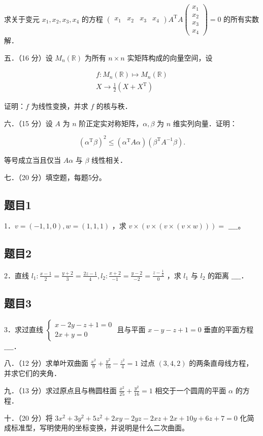\documentclass{article}
\begin{document}
求关于变元 \(x_{1}, x_{2}, x_{3}, x_{4}\) 的方程 \(\left(\begin{array}{llll}x_{1} & x_{2} & x_{3} & x_{4}\end{array}\right) A^{\mathrm{T}} A\left(\begin{array}{l}x_{1} \\ x_{2} \\ x_{3} \\ x_{4}\end{array}\right)=0\) 的所有实数解．

五．（16 分）设 \(M_{n}(\mathbb{R})\) 为所有 \(n \times n\) 实矩阵构成的向量空间，设

\[
\begin{gathered}
f: M_{n}(\mathbb{R}) \mapsto M_{n}(\mathbb{R}) \\
X \rightarrow \frac{1}{2}\left(X+X^{\mathrm{T}}\right)
\end{gathered}
\]

证明：\(f\) 为线性变换，并求 \(f\) 的核与秩．

六．（15 分）设 \(A\) 为 \(n\) 阶正定实对称矩阵，\(\alpha, \beta\) 为 \(n\) 维实列向量．证明：

\[
\left(\alpha^{\mathrm{T}} \beta\right)^{2} \leq\left(\alpha^{\mathrm{T}} A \alpha\right)\left(\beta^{\mathrm{T}} A^{-1} \beta\right) .
\]

等号成立当且仅当 \(A \alpha\) 与 \(\beta\) 线性相关．

七．（20 分）填空题，每题5分。\\

\subsection{题目1}
1．\(v=(-1,1,0), w=(1,1,1)\) ，求 \(v \times(v \times(v \times(v \times w)))=\) \(\_\_\_\_\)。\\

\subsection{题目2}
2．直线 \(l_{1}: \frac{x-1}{2}=\frac{y+2}{3}=\frac{2 z-1}{4}, l_{2}: \frac{x+2}{-1}=\frac{y-2}{-2}=\frac{z-\frac{1}{2}}{0}\) ，求 \(l_{1}\) 与 \(l_{2}\) 的距离 \(\_\_\_\_\)．\\

\subsection{题目3}
3．求过直线 \(\left\{\begin{array}{l}x-2 y-z+1=0 \\ 2 x+y=0\end{array}\right.\) 且与平面 \(x-y-z+1=0\) 垂直的平面方程\\
\(\_\_\_\_\)．

八．（12 分）求单叶双曲面 \(\frac{x^{2}}{9}+\frac{y^{2}}{16}-\frac{z^{2}}{4}=1\) 过点 \((3,4,2)\) 的两条直母线方程，并求它们的夹角．

九．（13 分）求过原点且与椭圆柱面 \(\frac{x^{2}}{25}+\frac{y^{2}}{16}=1\) 相交于一个圆周的平面 \(\alpha\) 的方程．

十．（20 分）将 \(3 x^{2}+3 y^{2}+5 z^{2}+2 x y-2 y z-2 x z+2 x+10 y+6 z+7=0\) 化简成标准型，写明使用的坐标变换，并说明是什么二次曲面。
\end{document}
